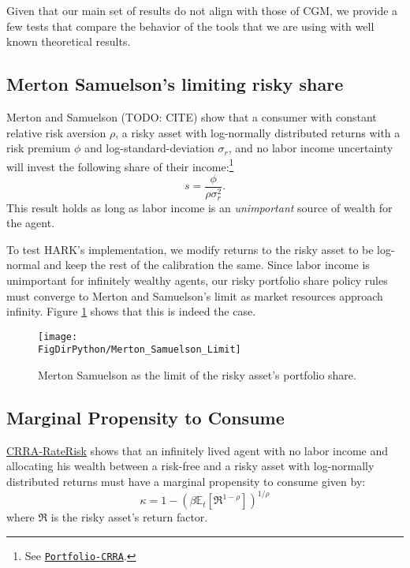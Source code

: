 \documentclass[../CGMPort.tex]{subfiles}
\begin{document}
Given that our main set of results do not align with those of CGM,
we provide a few tests that compare the behavior of the tools that we are using with well known theoretical results.

\subsection{Merton Samuelson's limiting risky share}

Merton and Samuelson (TODO: CITE) show that a consumer with constant relative
risk aversion $\rho$, a risky asset with log-normally distributed returns
with a risk premium $\phi$ and log-standard-deviation $\sigma_r$, and no labor income uncertainty will invest the following share of their income:\footnote{See 
\href{http://www.econ2.jhu.edu/people/ccarroll/public/lecturenotes/AssetPricing/Portfolio-CRRA/}{\texttt{Portfolio-CRRA}}.}
\begin{equation}
	s = \frac{\phi}{\rho \sigma^2_r}.
\end{equation}
This result holds as long as labor income is an \emph{unimportant} source of
wealth for the agent.

To test HARK's implementation, we modify returns to the risky asset to be 
log-normal and keep the rest of the calibration the same. Since labor income
is unimportant for infinitely wealthy agents, our risky portfolio share policy rules must converge to Merton and Samuelson's limit as market resources approach infinity. Figure \ref{fig:MS_share_limit} shows that this is indeed the case.

\begin{figure}[h]
	\texttt{[image: \\FigDirPython/Merton\_Samuelson\_Limit]}
	\caption{Merton Samuelson as the limit of the risky asset's portfolio 
		share.}\label{fig:MS_share_limit}
\end{figure}

\subsection{Marginal Propensity to Consume}

\href{http://www.econ2.jhu.edu/people/ccarroll/public/LectureNotes/Consumption/CRRA-RateRisk/}{CRRA-RateRisk}
shows that an infinitely lived agent with no labor income and allocating
his wealth between a risk-free and a risky asset with log-normally distributed
returns must have a marginal propensity to consume given by:
\begin{equation}\label{eq:mpc_limit}
	\kappa = 1 - \left( \beta \mathbb{E}_t \left[ \mathfrak{R}^{1-\rho} \right] 
	\right)	^{1/\rho}
\end{equation}
where $\mathfrak{R}$ is the risky asset's return factor.
\end{document}
